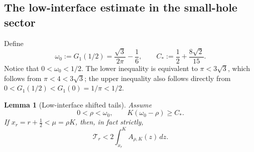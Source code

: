 \documentclass[11pt]{article}
\numberwithin{equation}{section}
\newtheorem{lemma}[theorem]{Lemma}
\theoremstyle{definition}
\theoremstyle{remark}
\begin{document}
\subsection{The low-interface estimate in the small-hole sector}

Define
\begin{equation}
  \omega_0:=G_1(1/2)=\frac{\sqrt3}{2\pi}-\frac16,
  \qquad
  C_*:=\frac12+\frac{8\sqrt2}{15}.
  \label{eq:sc-small-hole-constants}
\end{equation}
Notice that \(0<\omega_0<1/2\).  The lower inequality is equivalent to
\(\pi<3\sqrt3\), which follows from \(\pi<4<3\sqrt3\); the upper inequality
also follows directly from \(0<G_1(1/2)<G_1(0)=1/\pi<1/2\).

\begin{lemma}[Low-interface shifted tails]
\label{lem:sc-low-interface-tails}
Assume
\begin{equation}
  0<\rho<\omega_0,
  \qquad
  K(\omega_0-\rho)\ge C_*.
  \label{eq:sc-low-interface-sector}
\end{equation}
If \(x_r=r+\tfrac12<\mu=\rho K\), then, in fact strictly,
\begin{equation}
  \mathcal T_r
  <2\int_{x_r}^{K}A_{\rho,K}(z)\,dz.
  \label{eq:sc-low-tail-conclusion}
\end{equation}
\end{lemma}
\end{document}
